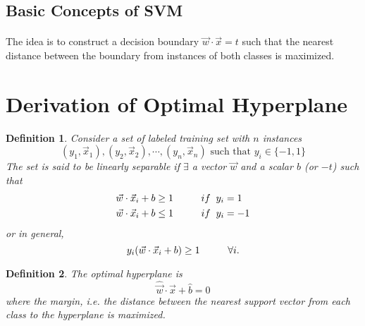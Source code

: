\documentclass{article}
\newtheorem{definition}{Definition}
\begin{document}
\subsection{Basic Concepts of SVM}
\paragraph{}
The idea is to construct a decision boundary $\Vec{w}\cdot\Vec{x} = t$ such that the nearest distance between the boundary from instances of both classes is maximized.

\section{Derivation of Optimal Hyperplane}
\begin{definition}
Consider a set of labeled training set with $n$ instances
\begin{equation*}
    (y_1, \Vec{x}_1),(y_2, \Vec{x}_2), \cdots, (y_n, \Vec{x}_n) \text{ such that } y_i \in \{-1, 1\}
\end{equation*}
The set is said to be linearly separable if $\exists$ a vector $\Vec{w}$ and a scalar $b$ (or $-t$) such that
\begin{align*}
    \Vec{w} \cdot \Vec{x}_i + b \geq 1 \hspace{10mm} &if \hspace{2mm} y_i = 1 \\
    \Vec{w} \cdot \Vec{x}_i + b \leq 1 \hspace{10mm} &if \hspace{2mm} y_i = -1 
\end{align*}
or in general,
\begin{equation}
    y_i(\Vec{w} \cdot \Vec{x}_i + b) \geq 1 \hspace{10mm} \forall i.
\end{equation}
\end{definition}

\begin{definition}
The optimal hyperplane is 
\begin{equation*}
    \hat{\Vec{w}}\cdot\Vec{x} + \hat{b} = 0
\end{equation*}
where the margin, i.e. the distance between the nearest support vector from each class to the hyperplane is maximized.
\end{definition}
\end{document}

